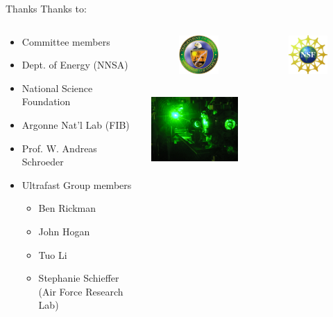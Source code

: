 \documentclass[mathserif]{beamer}
\begin{document}
\begin{frame}{Thanks}
Thanks to:
\begin{columns}
  \begin{column}{.49\linewidth}
    \begin{itemize}
      \item Committee members
      \item Dept. of Energy (NNSA)
      \item National Science Foundation
      \item Argonne Nat'l Lab (FIB)
      \item Prof. W. Andreas Schroeder
      \item Ultrafast Group members
      \begin{itemize}
        \item Ben Rickman
        \item John Hogan
        \item Tuo Li
        \item Stephanie Schieffer\\(Air Force Research Lab)
      \end{itemize}
    \end{itemize}
  \end{column}

  \begin{column}{.49\linewidth}
    \begin{columns}
      \begin{column}{1in}
        \begin{figure}
          \includegraphics[width=0.7in]{doe}
        \end{figure}
      \end{column}

      \begin{column}{1in}
        \begin{figure}
          \includegraphics[width=0.7in]{nsf}
        \end{figure}
      \end{column}
    \end{columns}
    \vspace{0.4in}
    \begin{center}
      \includegraphics[width=1.3in]{Laser_Small}
    \end{center}
  \end{column}
\end{columns}
\end{frame}

%
\end{document}
